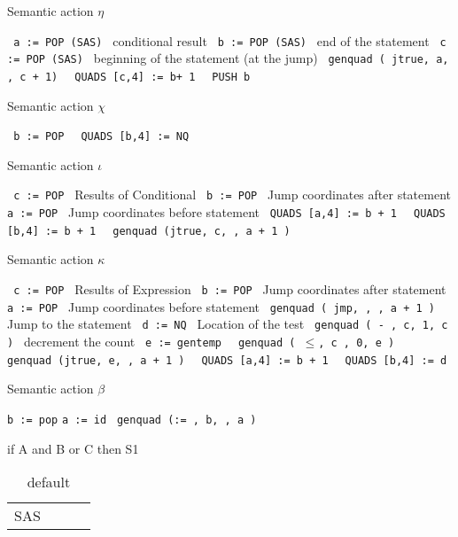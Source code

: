 \begin {algorithm}
\caption{ Semantic action $\eta$ }
\label{alg:lambda3}
\begin{algorithmic}
\STATE \texttt { a := POP (SAS) }  conditional result
\STATE \texttt { b := POP (SAS) }  end of the statement
\STATE \texttt { c := POP (SAS) }  beginning of the statement (at the jump)
\STATE \texttt { genquad ( jtrue, a, , c + 1) }
\STATE \texttt { QUADS [c,4] := b+ 1 }
\STATE \texttt { PUSH b}
\end{algorithmic}
\end{algorithm}

\begin {algorithm}
\caption{ Semantic action $\chi$ }
\label{alg:lambda3}
\begin{algorithmic}
\STATE \texttt { b :=  POP }
\STATE \texttt { QUADS [b,4] := NQ }
\end{algorithmic}
\end{algorithm}

\begin {algorithm}
\caption{ Semantic action $\iota$ }
\label{alg:lambda3}
\begin{algorithmic}
\STATE \texttt { c := POP } Results of Conditional
\STATE \texttt { b := POP } Jump coordinates after statement
\STATE \texttt { a := POP } Jump coordinates before statement
\STATE \texttt { QUADS [a,4] := b + 1 }
\STATE \texttt { QUADS [b,4] := b + 1 }
\STATE \texttt { genquad (jtrue, c, , a + 1 )  }
\end{algorithmic}
\end{algorithm}

\begin {algorithm}
\caption{ Semantic action $\kappa$ }
\label{alg:lambda3}
\begin{algorithmic}
\STATE \texttt { c := POP } Results of Expression
\STATE \texttt { b := POP } Jump coordinates after statement
\STATE \texttt { a := POP } Jump coordinates before statement
\STATE \texttt { genquad ( jmp, , , a + 1 ) }   Jump to the statement
\STATE \texttt { d := NQ }  Location of the test
\STATE \texttt { genquad ( - , c, 1, c ) }   decrement the count
\STATE \texttt { e := gentemp }
\STATE \texttt { genquad ( $\le$, c , 0, e ) } 
\STATE \texttt { genquad (jtrue, e, , a + 1 )  }
\STATE \texttt { QUADS [a,4] := b + 1 }
\STATE \texttt { QUADS [b,4] := d  }
\end{algorithmic}
\end{algorithm}

\begin {algorithm}
\caption{ Semantic action $\beta$ }
\label{alg:lambda0}
\begin{algorithmic}
\STATE \texttt {b := pop}
\STATE \texttt {a := id }
\STATE \texttt {genquad (:= , b, , a ) }
\end{algorithmic}
\end{algorithm}


if A and B or C then S1


\begin{table}[htdp]
\caption{default}
\begin{center}
\begin{tabular}{|l|l|l|l|}
SAS	&	
\end{tabular}
\end{center}
\label{default}
\end{table}%

